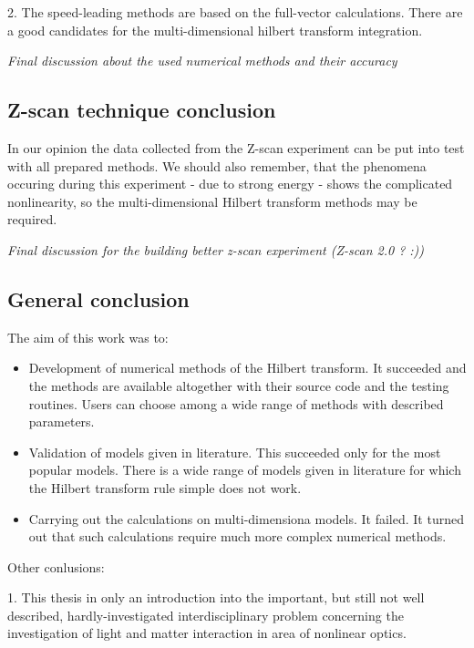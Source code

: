 \documentclass[12pt,twoside,a4paper]{article}
\numberwithin{equation}{subsection}
\numberwithin{figure}{subsection}
\begin{document}
2. The speed-leading methods are based on the full-vector calculations. There are a good candidates for the multi-dimensional
hilbert transform integration.

\textit{Final discussion about the used numerical methods and their accuracy}

\subsection{Z-scan technique conclusion} \label{chap:conclusion_zscan}

In our opinion the data collected from the Z-scan experiment can be put into test with all prepared methods. We should also
remember, that the phenomena occuring during this experiment  - due to strong energy - shows the complicated nonlinearity, so the
multi-dimensional Hilbert transform methods may be required. 

\textit{Final discussion for the building better z-scan experiment (Z-scan 2.0 ? :))}

\subsection{General conclusion} \label{chap:conclusion_general}

The aim of this work was to:

\begin{itemize} 
	\item Development of numerical methods of the Hilbert transform. It succeeded and the methods are available altogether with
	their source code and the testing routines. Users can choose among a wide range of methods with described parameters.
	\item Validation of models given in literature. This succeeded only for the most popular models. There is a wide range of models
	given in literature for which the Hilbert transform rule simple does not work.
	\item Carrying out the calculations on multi-dimensiona models. It failed. It turned out that such calculations require much more
	complex numerical methods.
\end{itemize}

Other conlusions:


1. This thesis in only an introduction into the important, but still not well described, hardly-investigated interdisciplinary
problem concerning the investigation of light and matter interaction in area of nonlinear optics. 
\end{document}
